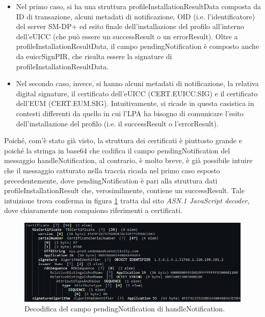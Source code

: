 \documentclass[10pt, oneside]{book}
\begin{document}
\begin{itemize}
\item Nel primo caso, si ha una struttura profileInstallationResultData composta da ID di transazione, alcuni metadati di notificazione, OID (i.e. l'identificatore) del server SM-DP+ ed esito finale dell'installazione del profilo all'interno dell'eUICC (che può essere un successResult o un errorResult). Oltre a profileInstallationResultData, il campo pendingNotification è composto anche da euiccSignPIR, che risulta essere la signature di profileInstallationResultData.
\item Nel secondo caso, invece, si hanno alcuni metadati di notificazione, la relativa digital signature, il certificato dell'eUICC (CERT.EUICC.SIG) e il certificato dell'EUM (CERT.EUM.SIG). Intuitivamente, si ricade in questa casistica in contesti differenti da quello in cui l'LPA ha bisogno di comunicare l'esito dell'installazione del profilo (i.e. il successResult o l'errorResult).
\end{itemize}
Poiché, com'è stato già visto, la struttura dei certificati è piuttosto grande e poiché la stringa in base64 che codifica il campo pendingNotification del messaggio handleNotification, al contrario, è molto breve, è già possibile intuire che il messaggio catturato nella traccia ricada nel primo caso esposto precedentemente, dove pendingNotification è pari alla struttura dati profileInstallationResult che, verosimilmente, contiene un successResult. Tale intuizione trova conferma in figura \ref{fig:decode-pendingNotification} tratta dal sito \textit{ASN.1 JavaScript decoder}, dove chiaramente non compaiono riferimenti a certificati.
\begin{figure}
\includegraphics[width=\linewidth]{decode-pendingNotification.png}
\caption{Decodifica del campo pendingNotification di handleNotification.}
\label{fig:decode-pendingNotification}
\end{figure}
\end{document}
